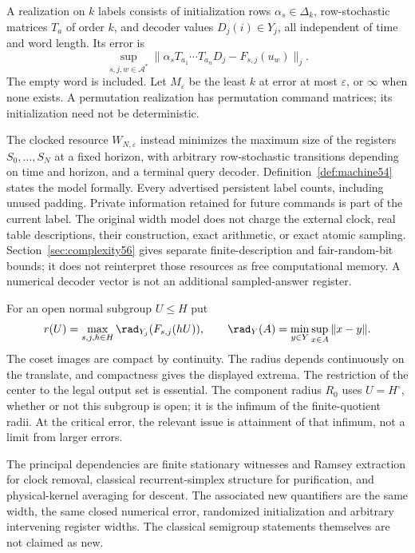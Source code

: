 \begin{definition}\label{def:stationary55}
A realization on $k$ labels consists of initialization rows $\alpha_s\in\Delta_k$, row-stochastic matrices $T_a$ of order $k$, and decoder values $D_j(i)\in Y_j$, all independent of time and word length. Its error is
\[
       \sup_{s,j,w\in\mathcal A^*}
        \|\alpha_sT_{a_1}\cdots T_{a_n}D_j-F_{s,j}(u_w)\|_j.
\]
The empty word is included. Let $M_\varepsilon$ be the least $k$ at error at most $\varepsilon$, or $\infty$ when none exists. A permutation realization has permutation command matrices; its initialization need not be deterministic.
\end{definition}
The clocked resource $W_{N,\varepsilon}$ instead minimizes the maximum size of the registers $S_0,\ldots,S_N$ at a fixed horizon, with arbitrary row-stochastic transitions depending on time and horizon, and a terminal query decoder. Definition~\ref{def:machine54} states the model formally. Every advertised persistent label counts, including unused padding. Private information retained for future commands is part of the current label. The original width model does not charge the external clock, real table descriptions, their construction, exact arithmetic, or exact atomic sampling. Section~\ref{sec:complexity56} gives separate finite-description and fair-random-bit bounds; it does not reinterpret those resources as free computational memory. A numerical decoder vector is not an additional sampled-answer register.

For an open normal subgroup $U\le H$ put
\begin{equation}\label{eq:quotientradius55}
 r(U)=\max_{s,j,h\in H}\rad_{Y_j}(F_{s,j}(hU)),
 \qquad\rad_Y(A)=\min_{y\in Y}\sup_{x\in A}\|x-y\|.
\end{equation}
The coset images are compact by continuity. The radius depends continuously on the translate, and compactness gives the displayed extrema. The restriction of the center to the legal output set is essential. The component radius $R_0$ uses $U=H^\circ$, whether or not this subgroup is open; it is the infimum of the finite-quotient radii. At the critical error, the relevant issue is attainment of that infimum, not a limit from larger errors.


The principal dependencies are finite stationary witnesses and Ramsey
extraction for clock removal, classical recurrent-simplex structure for
purification, and physical-kernel averaging for descent. The associated
new quantifiers are the same width, the same closed numerical error,
randomized initialization and arbitrary intervening register widths.
The classical semigroup statements themselves are not claimed as new.
